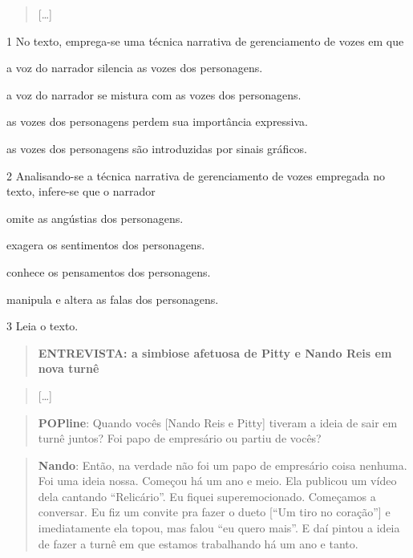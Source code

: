 \begin{quote}
{[}\ldots{]}
\end{quote}



\num{1} No texto, emprega-se uma técnica narrativa de gerenciamento de
vozes em que

\begin{escolha}
\item a voz do narrador silencia as vozes dos personagens.

\item a voz do narrador se mistura com as vozes dos personagens.

\item as vozes dos personagens perdem sua importância expressiva.

\item as vozes dos personagens são introduzidas por sinais gráficos.
\end{escolha}

\num{2} Analisando-se a técnica narrativa de gerenciamento de vozes
empregada no texto, infere-se que o narrador

\begin{escolha}
\item omite as angústias dos personagens.
\item exagera os sentimentos dos personagens.
\item conhece os pensamentos dos personagens.
\item manipula e altera as falas dos personagens.
\end{escolha}

\num{3} Leia o texto.


\begin{quote}
\textbf{ENTREVISTA: a simbiose afetuosa de Pitty e Nando Reis em nova
turnê}
\end{quote}

\begin{quote}
{[}\ldots{]}
\end{quote}

\begin{quote}
\textbf{POPline}: Quando vocês {[}Nando Reis e Pitty{]} tiveram a ideia
de sair em turnê juntos? Foi papo de empresário ou partiu de vocês?
\end{quote}

\begin{quote}
\textbf{Nando}: Então, na verdade não foi um papo de empresário coisa
nenhuma. Foi uma ideia nossa. Começou há um ano e meio. Ela publicou um
vídeo dela cantando ``Relicário''. Eu fiquei superemocionado. Começamos
a conversar. Eu fiz um convite pra fazer o dueto {[}``Um tiro no
coração''{]} e imediatamente ela topou, mas falou ``eu quero mais''. E
daí pintou a ideia de fazer a turnê em que estamos trabalhando há um ano
e tanto.
\end{quote}

